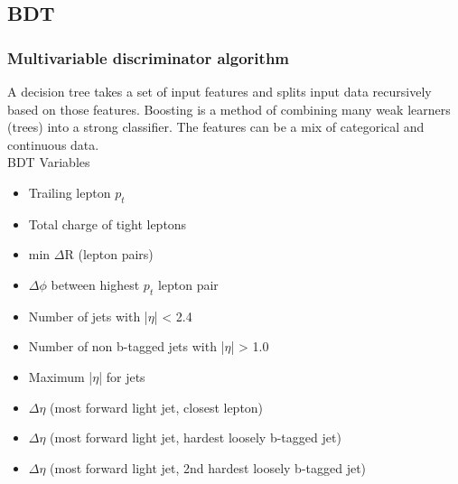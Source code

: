 \documentclass[11pt]{beamer}
\begin{document}
\begin{frame}
\subsection{BDT}
\frametitle{Multivariable discriminator algorithm}
\small{
	A decision tree takes a set of input features and splits input data recursively based on
	those features.
	Boosting is a method of combining many weak learners (trees) into a strong classifier. The features can be a mix of categorical and continuous data.\\
	\vspace{10px}
	BDT Variables}
\tiny{
	\begin{itemize}
		\item	Trailing lepton $p_{t}$
		\item 	Total charge of tight leptons
		\item 	min $\Delta$R (lepton pairs)
		\item 	$\Delta\phi$ between highest $p_t$ lepton pair
		\item 	Number of jets with |$\eta$| < 2.4
		\item	Number of non b-tagged jets with |$\eta$| > 1.0
		\item	Maximum |$\eta$| for jets
		\item	$\Delta\eta$ (most forward light jet, closest lepton)
		\item	$\Delta\eta$ (most forward light jet, hardest loosely b-tagged jet)
		\item	$\Delta\eta$ (most forward light jet, 2nd hardest loosely b-tagged jet)
\end{itemize} }
\end{frame}
\end{document}
